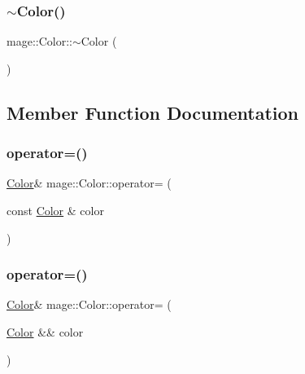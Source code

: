 \hypertarget{structmage_1_1_color_aa4df1c9718b7846adf77fbeed79ac219}{}\label{structmage_1_1_color_aa4df1c9718b7846adf77fbeed79ac219} 
\subsubsection{\texorpdfstring{$\sim$\+Color()}{~Color()}}
{\footnotesize\ttfamily mage\+::\+Color\+::$\sim$\+Color (\begin{DoxyParamCaption}{ }\end{DoxyParamCaption})\hspace{0.3cm}{\ttfamily [default]}}



\subsection{Member Function Documentation}
\hypertarget{structmage_1_1_color_a006c8ce9bf69e54598c5981fe79d742c}{}\label{structmage_1_1_color_a006c8ce9bf69e54598c5981fe79d742c} 
\subsubsection{\texorpdfstring{operator=()}{operator=()}\hspace{0.1cm}{\footnotesize\ttfamily [1/2]}}
{\footnotesize\ttfamily \hyperlink{structmage_1_1_color}{Color}\& mage\+::\+Color\+::operator= (\begin{DoxyParamCaption}\item[{const \hyperlink{structmage_1_1_color}{Color} \&}]{color }\end{DoxyParamCaption})}

\hypertarget{structmage_1_1_color_afe64cf3cf65b5812ac35674917abb12c}{}\label{structmage_1_1_color_afe64cf3cf65b5812ac35674917abb12c} 
\subsubsection{\texorpdfstring{operator=()}{operator=()}\hspace{0.1cm}{\footnotesize\ttfamily [2/2]}}
{\footnotesize\ttfamily \hyperlink{structmage_1_1_color}{Color}\& mage\+::\+Color\+::operator= (\begin{DoxyParamCaption}\item[{\hyperlink{structmage_1_1_color}{Color} \&\&}]{color }\end{DoxyParamCaption})}

